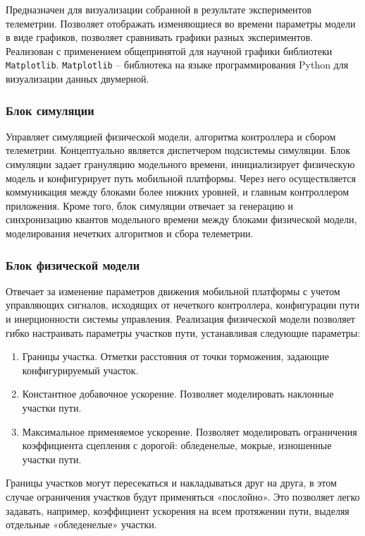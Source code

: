 Предназначен для визуализации собранной в результате экспериментов телеметрии. Позволяет отображать изменяющиеся во времени параметры модели в виде графиков, позволяет сравнивать графики разных экспериментов. Реализован с применением общепринятой для научной графики библиотеки \lstinline!Matplotlib!. \lstinline!Matplotlib! – библиотека на языке программирования Python для визуализации данных двумерной.

\subsubsection{Блок симуляции} 

Управляет симуляцией физической модели, алгоритма контроллера и сбором телеметрии. Концептуально является диспетчером подсистемы симуляции. Блок симуляции задает грануляцию модельного времени, инициализирует физическую модель и конфигурирует путь мобильной платформы. Через него осуществляется коммуникация между блоками более нижних уровней, и главным контроллером приложения. Кроме того, блок симуляции отвечает за генерацию и синхронизацию квантов модельного времени между блоками физической модели, моделирования нечетких алгоритмов и сбора телеметрии.

\subsubsection{Блок физической модели} 

Отвечает за изменение параметров движения мобильной платформы с учетом управляющих сигналов, исходящих от нечеткого контроллера, конфигурации пути и инерционности системы управления. Реализация физической модели позволяет гибко настраивать параметры участков пути, устанавливая следующие параметры:

\begin{enumerate}[label=\arabic*)]
  \item   Границы участка. Отметки расстояния от точки торможения, задающие конфигурируемый участок.
  \item   Константное добавочное ускорение. Позволяет моделировать наклонные участки пути.
  \item   Максимальное применяемое ускорение. Позволяет моделировать ограничения коэффициента сцепления с дорогой: обледенелые, мокрые, изношенные участки пути.
\end{enumerate}


Границы участков могут пересекаться и накладываться друг на друга, в этом случае ограничения участков будут применяться «послойно». Это позволяет легко задавать, например, коэффициент ускорения на всем протяжении пути, выделяя отдельные «обледенелые» участки.

